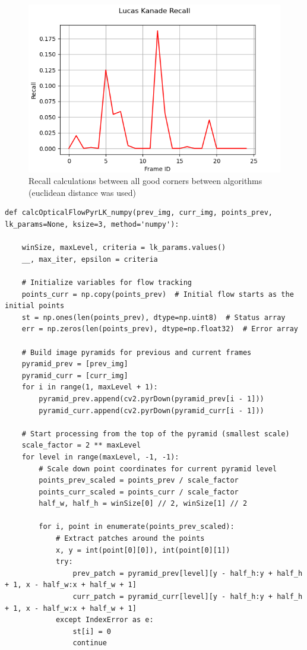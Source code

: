 \documentclass[11pt, conference, letterpaper]{IEEEtran}
\begin{document}
\begin{figure}[t]
    \centering
    \includegraphics[width=0.45\linewidth]{images/lk_recall.png}
    \caption{Recall calculations between all good corners between algorithms (euclidean distance was used)}
    \label{fig:lk-rec}
\end{figure}


\onecolumn
\begin{lstlisting}[style=python, caption={\texttt{calcOpticalFlowPyrLK\_numpy}}, label={lst:calcOpticalFlowPyrLK}]
    def calcOpticalFlowPyrLK_numpy(prev_img, curr_img, points_prev, lk_params=None, ksize=3, method='numpy'):

    winSize, maxLevel, criteria = lk_params.values()
    __, max_iter, epsilon = criteria
    
    # Initialize variables for flow tracking
    points_curr = np.copy(points_prev)  # Initial flow starts as the initial points
    st = np.ones(len(points_prev), dtype=np.uint8)  # Status array
    err = np.zeros(len(points_prev), dtype=np.float32)  # Error array

    # Build image pyramids for previous and current frames
    pyramid_prev = [prev_img]
    pyramid_curr = [curr_img]
    for i in range(1, maxLevel + 1):
        pyramid_prev.append(cv2.pyrDown(pyramid_prev[i - 1]))
        pyramid_curr.append(cv2.pyrDown(pyramid_curr[i - 1]))

    # Start processing from the top of the pyramid (smallest scale)
    scale_factor = 2 ** maxLevel
    for level in range(maxLevel, -1, -1):
        # Scale down point coordinates for current pyramid level
        points_prev_scaled = points_prev / scale_factor
        points_curr_scaled = points_curr / scale_factor
        half_w, half_h = winSize[0] // 2, winSize[1] // 2

        for i, point in enumerate(points_prev_scaled):
            # Extract patches around the points
            x, y = int(point[0][0]), int(point[0][1])
            try:
                prev_patch = pyramid_prev[level][y - half_h:y + half_h + 1, x - half_w:x + half_w + 1]
                curr_patch = pyramid_curr[level][y - half_h:y + half_h + 1, x - half_w:x + half_w + 1]
            except IndexError as e:
                st[i] = 0
                continue


\end{lstlisting}
\end{document}
